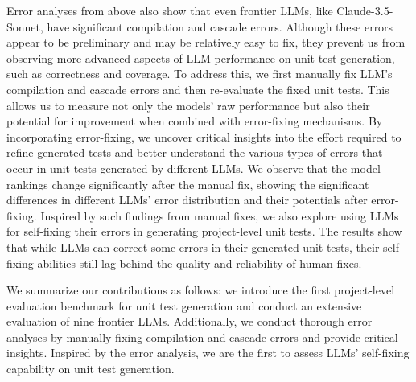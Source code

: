 Error analyses from above also show that even frontier LLMs, like Claude-3.5-Sonnet, have significant compilation and cascade errors. Although these errors appear to be preliminary and may be relatively easy to fix, they prevent us from observing more advanced aspects of LLM performance on unit test generation, such as correctness and coverage.
To address this, we first manually fix LLM's compilation and cascade errors and then re-evaluate the fixed unit tests. 
This allows us to measure not only the models' raw performance but also their potential for improvement when combined with error-fixing mechanisms. By incorporating error-fixing, we uncover critical insights into the effort required to refine generated tests and better understand the various types of errors that occur in unit tests generated by different LLMs. 
We observe that the model rankings change significantly after the manual fix, showing the significant differences in different LLMs' error distribution and their potentials after error-fixing.
Inspired by such findings from manual fixes, we also explore using LLMs for self-fixing their errors in generating project-level unit tests. The results show that while LLMs can correct some errors in their generated unit tests, their self-fixing abilities still lag behind the quality and reliability of human fixes.

We summarize our contributions as follows: we introduce the first project-level evaluation benchmark for unit test generation and conduct an extensive evaluation of nine frontier LLMs. Additionally, we conduct thorough error analyses by manually fixing compilation and cascade errors and provide critical insights. Inspired by the error analysis, we are the first to assess LLMs' self-fixing capability on unit test generation.

